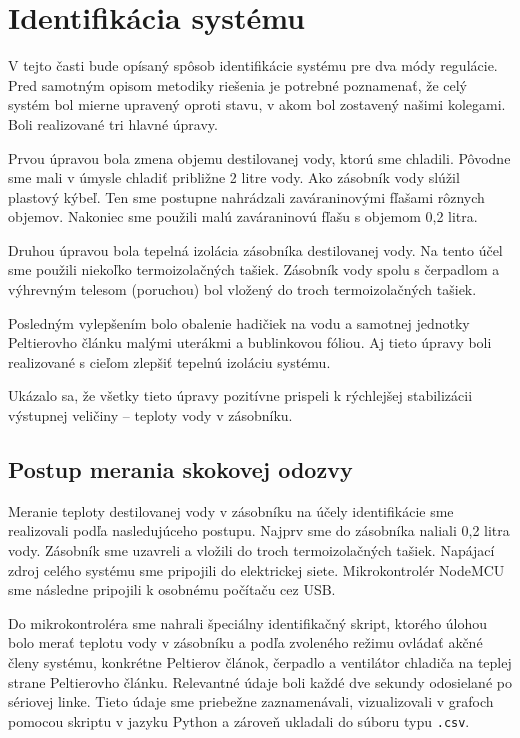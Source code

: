 \section{Identifikácia systému}

V tejto časti bude opísaný spôsob identifikácie systému pre dva módy regulácie. Pred samotným opisom metodiky riešenia je potrebné poznamenať, že celý systém bol mierne upravený oproti stavu, v akom bol zostavený našimi kolegami. Boli realizované tri hlavné úpravy.

Prvou úpravou bola zmena objemu destilovanej vody, ktorú sme chladili. Pôvodne sme mali v úmysle chladiť približne 2 litre vody. Ako zásobník vody slúžil plastový kýbeľ. Ten sme postupne nahrádzali zaváraninovými fľašami rôznych objemov. Nakoniec sme použili malú zaváraninovú fľašu s objemom 0,2 litra.

Druhou úpravou bola tepelná izolácia zásobníka destilovanej vody. Na tento účel sme použili niekoľko termoizolačných tašiek. Zásobník vody spolu s čerpadlom a výhrevným telesom (poruchou) bol vložený do troch termoizolačných tašiek.

Posledným vylepšením bolo obalenie hadičiek na vodu a samotnej jednotky Peltierovho článku malými uterákmi a bublinkovou fóliou. Aj tieto úpravy boli realizované s cieľom zlepšiť tepelnú izoláciu systému.

Ukázalo sa, že všetky tieto úpravy pozitívne prispeli k rýchlejšej stabilizácii výstupnej veličiny – teploty vody v zásobníku.

\subsection{Postup merania skokovej odozvy}

Meranie teploty destilovanej vody v zásobníku na účely identifikácie sme realizovali podľa nasledujúceho postupu. Najprv sme do zásobníka naliali 0,2 litra vody. Zásobník sme uzavreli a vložili do troch termoizolačných tašiek. Napájací zdroj celého systému sme pripojili do elektrickej siete. Mikrokontrolér NodeMCU sme následne pripojili k osobnému počítaču cez USB.

Do mikrokontroléra sme nahrali špeciálny identifikačný skript, ktorého úlohou bolo merať teplotu vody v zásobníku a podľa zvoleného režimu ovládať akčné členy systému, konkrétne Peltierov článok, čerpadlo a ventilátor chladiča na teplej strane Peltierovho článku. Relevantné údaje boli každé dve sekundy odosielané po sériovej linke. Tieto údaje sme priebežne zaznamenávali, vizualizovali v grafoch pomocou skriptu v jazyku Python a zároveň ukladali do súboru typu \texttt{.csv}.

